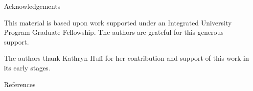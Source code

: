 \documentclass[final]{beamer}
\newlength{\onecolwid}
\newlength{\threecolwid}
\begin{document}
\begin{frame}[t]
\begin{columns}[t,totalwidth=\threecolwid]
\begin{column}{\onecolwid}

\begin{block}{Acknowledgements}

	This material is based upon work supported under an Integrated University Program Graduate Fellowship. The authors are grateful for this generous support.

The authors thank Kathryn Huff for her contribution and support of this work in its early stages.
	
\end{block}



\begin{block}{References}

	{\footnotesize 
	}
\end{block}





\end{column} %

\end{columns} %

\end{frame} %
\end{document}
